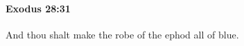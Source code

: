 
		\paragraph{Exodus 28:31} %
			\label{EXODUS-28-31}

			And thou shalt make the robe of the ephod all of blue.


